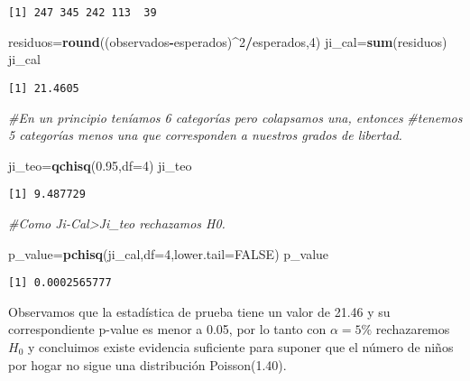 \documentclass[
  a4paper,
  oneside,
  openany]{book}
\newenvironment{Shaded}{\begin{snugshade}}{\end{snugshade}}
\newcommand{\CommentTok}[1]{\textcolor[rgb]{0.56,0.35,0.01}{\textit{#1}}}
\newcommand{\DataTypeTok}[1]{\textcolor[rgb]{0.13,0.29,0.53}{#1}}
\newcommand{\DecValTok}[1]{\textcolor[rgb]{0.00,0.00,0.81}{#1}}
\newcommand{\FloatTok}[1]{\textcolor[rgb]{0.00,0.00,0.81}{#1}}
\newcommand{\KeywordTok}[1]{\textcolor[rgb]{0.13,0.29,0.53}{\textbf{#1}}}
\newcommand{\NormalTok}[1]{#1}
\newcommand{\OperatorTok}[1]{\textcolor[rgb]{0.81,0.36,0.00}{\textbf{#1}}}
\newcommand{\OtherTok}[1]{\textcolor[rgb]{0.56,0.35,0.01}{#1}}
\begin{document}
\begin{verbatim}
[1] 247 345 242 113  39
\end{verbatim}

\begin{Shaded}
\begin{Highlighting}[]
\NormalTok{residuos=}\KeywordTok{round}\NormalTok{((observados}\OperatorTok{{-}}\NormalTok{esperados)}\OperatorTok{\^{}}\DecValTok{2}\OperatorTok{/}\NormalTok{esperados,}\DecValTok{4}\NormalTok{)}
\NormalTok{ji\_cal=}\KeywordTok{sum}\NormalTok{(residuos)}
\NormalTok{ji\_cal}
\end{Highlighting}
\end{Shaded}

\begin{verbatim}
[1] 21.4605
\end{verbatim}

\begin{Shaded}
\begin{Highlighting}[]
\CommentTok{\#En un principio teníamos 6 categorías pero colapsamos una, entonces }
\CommentTok{\#tenemos 5 categorías menos una que corresponden a nuestros grados de libertad.}

\NormalTok{ji\_teo=}\KeywordTok{qchisq}\NormalTok{(}\FloatTok{0.95}\NormalTok{,}\DataTypeTok{df=}\DecValTok{4}\NormalTok{)}
\NormalTok{ji\_teo}
\end{Highlighting}
\end{Shaded}

\begin{verbatim}
[1] 9.487729
\end{verbatim}

\begin{Shaded}
\begin{Highlighting}[]
\CommentTok{\#Como Ji{-}Cal\textgreater{}Ji\_teo rechazamos H0.}

\NormalTok{p\_value=}\KeywordTok{pchisq}\NormalTok{(ji\_cal,}\DataTypeTok{df=}\DecValTok{4}\NormalTok{,}\DataTypeTok{lower.tail=}\OtherTok{FALSE}\NormalTok{)}
\NormalTok{p\_value}
\end{Highlighting}
\end{Shaded}

\begin{verbatim}
[1] 0.0002565777
\end{verbatim}

Observamos que la estadística de prueba tiene un valor de 21.46 y su correspondiente p-value es menor a 0.05, por lo tanto con \(\alpha=5\%\) rechazaremos \(H_0\) y concluimos existe evidencia suficiente para suponer que el número de niños por hogar no sigue una distribución Poisson(1.40).
\end{document}
